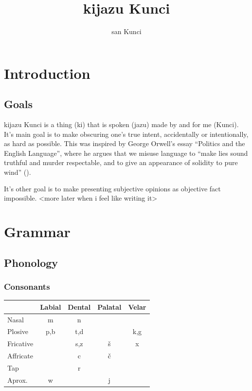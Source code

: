 \documentclass{clgrammar}
\title{kijazu Kunci}
\author{san Kunci}
\begin{document}
\frontmatter
\tableofcontents

\mainmatter
\part{Introduction}

\chapter{Goals}
	kijazu Kunci is a thing (ki) that is spoken (jazu) made by and for me (Kunci). It's main goal is to make obscuring one's true intent, accidentally or intentionally, as hard as possible. This was inspired by George Orwell's essay “Politics and the English Language'', where he argues that we misuse language to ``make lies sound truthful and murder respectable, and to give an appearance of solidity to pure wind'' (\cite{english}). 

	It's other goal is to make presenting subjective opinions as objective fact impossible. <more later when i feel like writing it>

	
\part{Grammar}

\chapter{Phonology}

\section{Consonants}

\begin{center}
    \begin{tabular}{l|c|c|c|c}
                  & Labial & Dental & Palatal & Velar \\
        \hline
		Nasal     &      m & n      &         &      \\
		Plosive   & p,b    & t,d    &         &  k,g \\
		Fricative &        & s,z    & š       &    x  \\
		Affricate &        &  c     & č       & \\
        Tap       &        & r & & \\
		Aprox.    & w &  & j &
    \end{tabular}
\end{center}
\end{document}
